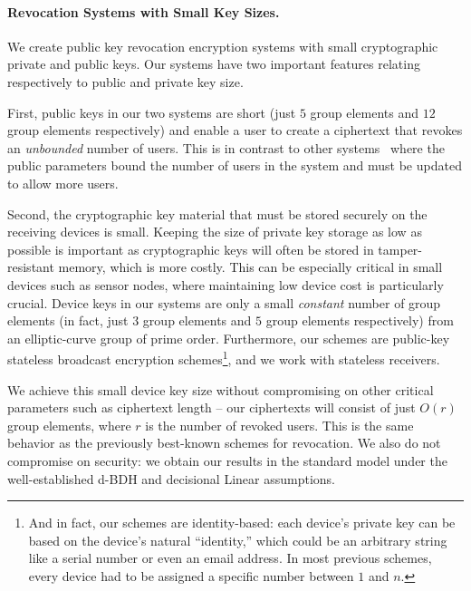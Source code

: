 \documentclass[a4paper, 11pt]{article}
\theoremstyle{definition}
\begin{document}
\paragraph{Revocation Systems with Small Key Sizes.}
We create public key revocation encryption systems with small
cryptographic private and public keys. Our systems have two important
features relating respectively to public and private key size.

First, public keys in our two systems are short (just $5$ group elements and $12$ group elements respectively)
and enable a user to create a ciphertext that revokes an \emph{unbounded}
number of users. This is in contrast to other systems~\cite{BGW05,NP01,DPP07}
where the public parameters bound the number of users in the system and
must be updated to allow more users.

Second, the cryptographic key material that must be stored securely on
the receiving devices is small. Keeping the size of private key
storage as low as possible is important as cryptographic keys will
often be stored in tamper-resistant memory, which is more costly. This
can be especially critical in small devices such as sensor nodes,
where maintaining low device cost is particularly crucial. Device keys
in our systems are only a small \emph{constant} number of group
elements (in fact, just $3$ group elements and $5$ group elements respectively) from an elliptic-curve
group of prime order.   Furthermore, our
schemes are public-key stateless broadcast encryption
schemes\footnote{And in fact, our schemes are identity-based: each
device's private key can be based on the device's natural
``identity,'' which could be an arbitrary string like a serial number
or even an email address.  In most previous schemes, every device had
to be assigned a specific number between $1$ and $n$.}, and we work
with stateless receivers.

We achieve this small device key size
without compromising on other critical parameters such as ciphertext
length -- our ciphertexts will consist of just $O(r)$ group elements,
where $r$ is the number of revoked users.  This is the same behavior
as the previously best-known schemes for revocation. We also do not compromise on security: we obtain our results in the standard model under the well-established d-BDH and decisional Linear assumptions.
\end{document}
